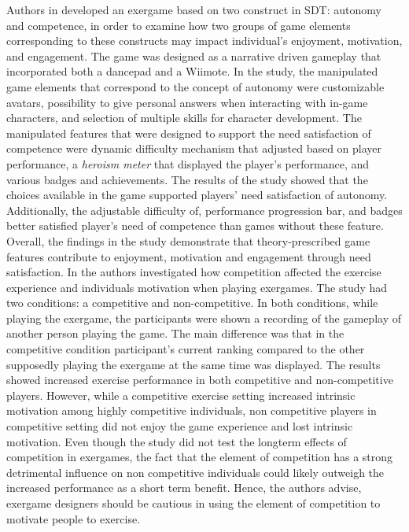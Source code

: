 Authors in \cite{peng2012need} developed an exergame based on two construct in SDT: autonomy and competence, in order to examine how two groups of game elements corresponding to these constructs may impact individual's enjoyment, motivation, and engagement. 
The game was designed as a narrative driven gameplay that incorporated both a dancepad and a Wiimote. In the study, the manipulated game elements that correspond to the concept of autonomy were customizable avatars,  possibility to give personal answers when interacting with in-game characters, and selection of multiple skills for character development. The manipulated features that were designed to support the need satisfaction of competence were dynamic difficulty mechanism that adjusted based on player performance, a \textit{heroism meter} that displayed the player's performance, and various badges and achievements. The results of the study showed that the choices available in the game supported players' need satisfaction of autonomy. Additionally,  the adjustable difficulty of, performance progression bar, and badges better satisfied player's need of competence than games without these feature. Overall, the
findings in the study demonstrate that theory-prescribed game features contribute to enjoyment, motivation and engagement through need satisfaction. In \cite{song2010effects} the authors investigated how competition
affected the exercise experience and individuals motivation when playing exergames. The study had two conditions: a competitive and non-competitive. In both conditions, while playing the exergame, the participants were shown a recording of
the gameplay of another person playing the game. The main difference was that in the competitive condition participant's current ranking compared to the other supposedly playing the exergame at the same time was displayed. The results showed increased exercise performance in both competitive and non-competitive players. However, while a
competitive exercise setting increased intrinsic motivation among highly competitive individuals, non competitive players in competitive setting did not enjoy the game experience and lost
intrinsic motivation. Even though the study did not test the longterm effects of competition in exergames, the fact that the element of competition has a
strong detrimental influence on non competitive individuals could likely outweigh the increased performance as a short term benefit. Hence, the authors advise, exergame designers should be cautious in using the element of competition to motivate people to exercise.

